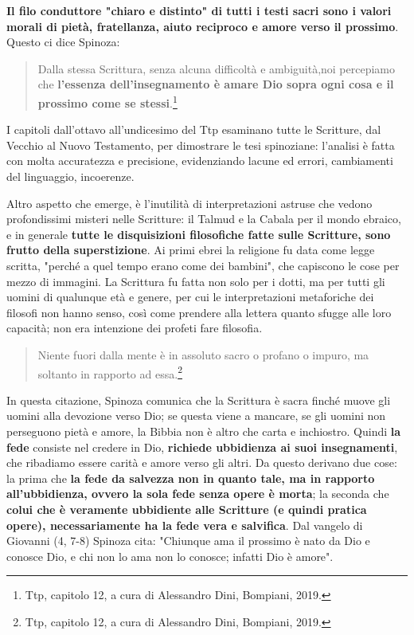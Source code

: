 \textbf{Il filo conduttore "chiaro e distinto" di tutti i testi sacri sono i valori morali di pietà, fratellanza, aiuto reciproco e amore verso il prossimo}. Questo ci dice Spinoza:

\begin{quotation}
	\small Dalla stessa Scrittura, senza alcuna difficoltà e ambiguità,noi percepiamo che \textbf{l'essenza dell'insegnamento è amare Dio sopra ogni cosa e il prossimo come se stessi}.\footnote{Ttp, capitolo 12, a cura di Alessandro Dini, Bompiani, 2019.}
 \end{quotation}

I capitoli dall'ottavo all'undicesimo del Ttp esaminano tutte le Scritture, dal Vecchio al Nuovo Testamento, per dimostrare le tesi spinoziane: l'analisi è fatta con molta accuratezza e precisione, evidenziando lacune ed errori, cambiamenti del linguaggio, incoerenze.

Altro aspetto che emerge, è l'inutilità di interpretazioni astruse che vedono profondissimi misteri nelle Scritture: il Talmud e la Cabala per il mondo ebraico, e in generale \textbf{tutte le disquisizioni filosofiche fatte sulle Scritture, sono frutto della superstizione}.
Ai primi ebrei la religione fu data come legge scritta, "perché a quel tempo erano come dei bambini", che capiscono le cose per mezzo di immagini. La Scrittura fu fatta non solo per i dotti, ma per tutti gli uomini di qualunque età e genere, per cui le interpretazioni metaforiche dei filosofi non hanno senso, così come  prendere alla lettera quanto sfugge alle loro capacità; non era intenzione dei profeti fare filosofia.

\begin{quotation}
	\small Niente fuori dalla mente è in assoluto sacro o profano o impuro, ma soltanto in rapporto ad essa.\footnote{Ttp, capitolo 12, a cura di Alessandro Dini, Bompiani, 2019.}
\end{quotation}

In questa citazione, Spinoza comunica che la Scrittura è sacra finché muove gli uomini alla devozione verso Dio; se questa viene a mancare, se gli uomini non perseguono pietà e amore,  la Bibbia non è altro che carta e inchiostro.
Quindi \textbf{la fede} consiste nel credere in Dio, \textbf{richiede ubbidienza ai suoi insegnamenti}, che ribadiamo essere carità e amore verso gli altri. Da questo derivano due cose: la prima che \textbf{la fede da salvezza non in quanto tale, ma in rapporto all'ubbidienza, ovvero la sola fede senza opere è morta}; la seconda che \textbf{colui che è veramente ubbidiente alle Scritture (e quindi pratica opere), necessariamente ha la fede vera e salvifica}. Dal vangelo di Giovanni (4, 7-8) Spinoza cita: "Chiunque ama il prossimo è nato da Dio e conosce Dio, e chi non lo ama non lo conosce; infatti Dio è amore".

